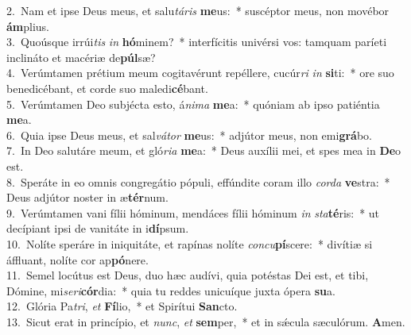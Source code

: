 {2.~}Nam et ipse Deus meus, et salu\textit{tá}\textit{ris} \textbf{me}us:~* suscéptor meus, non movébor \textbf{ám}plius.\\
{3.~}Quoúsque irrúi\textit{tis} \textit{in} \textbf{hó}minem?~* interfícitis univérsi vos: tamquam paríeti inclináto et macériæ de\textbf{púl}sæ?\\
{4.~}Verúmtamen prétium meum cogitavérunt repéllere, cucúr\textit{ri} \textit{in} \textbf{si}ti:~* ore suo benedicébant, et corde suo maledi\textbf{cé}bant.\\
{5.~}Verúmtamen Deo subjécta esto, á\textit{ni}\textit{ma} \textbf{me}a:~* quóniam ab ipso patiéntia \textbf{me}a.\\
{6.~}Quia ipse Deus meus, et sal\textit{vá}\textit{tor} \textbf{me}us:~* adjútor meus, non emi\textbf{grá}bo.\\
{7.~}In Deo salutáre meum, et gló\textit{ri}\textit{a} \textbf{me}a:~* Deus auxílii mei, et spes mea in \textbf{De}o est.\\
{8.~}Speráte in eo omnis congregátio pópuli, effúndite coram illo \textit{cor}\textit{da} \textbf{ve}stra:~* Deus adjútor noster in æ\textbf{tér}num.\\
{9.~}Verúmtamen vani fílii hóminum, mendáces fílii hóminum \textit{in} \textit{sta}\textbf{té}ris:~* ut decípiant ipsi de vanitáte in i\textbf{dí}psum.\\
{10.~}Nolíte speráre in iniquitáte, et rapínas nolíte \textit{con}\textit{cu}\textbf{pí}scere:~* divítiæ si áffluant, nolíte cor ap\textbf{pó}nere.\\
{11.~}Semel locútus est Deus, duo hæc audívi, quia potéstas Dei est, et tibi, Dómine, mi\textit{se}\textit{ri}\textbf{cór}dia:~* quia tu reddes unicuíque juxta ópera \textbf{su}a.\\
{12.~}Glória Pa\textit{tri}, \textit{et} \textbf{Fí}lio,~* et Spirítui \textbf{San}cto.\\
{13.~}Sicut erat in princípio, et \textit{nunc}, \textit{et} \textbf{sem}per,~* et in sǽcula sæculórum. \textbf{A}men.\\
